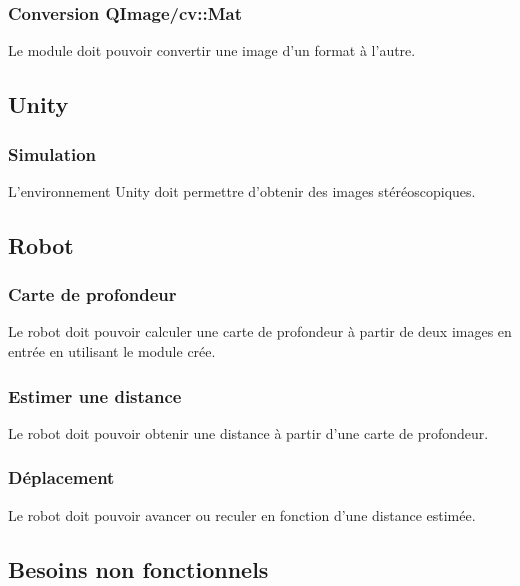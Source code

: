\documentclass[a4paper]{article}
\begin{document}
\subsubsection*{Conversion QImage/cv::Mat}

Le module doit pouvoir convertir une image d'un format à l'autre.

\subsection*{Unity}

\subsubsection*{Simulation}

L'environnement Unity doit permettre d'obtenir des images stéréoscopiques.

\subsection*{Robot}

\subsubsection*{Carte de profondeur}

Le robot doit pouvoir calculer une carte de profondeur à partir de deux images en
entrée en utilisant le module crée.

\subsubsection*{Estimer une distance}

Le robot doit pouvoir obtenir une distance à partir d'une carte de profondeur.

\subsubsection*{Déplacement}

Le robot doit pouvoir avancer ou reculer en fonction d'une distance estimée.


\subsection{Besoins non fonctionnels}
\end{document}
